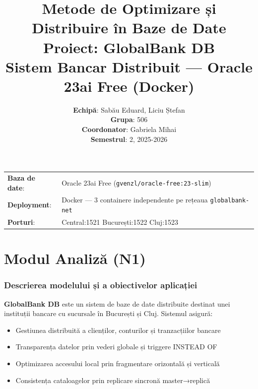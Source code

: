 \documentclass[12pt,a4paper]{article}
\title{
    \textbf{Metode de Optimizare și Distribuire în Baze de Date} \\[0.5em]
    \large Proiect: GlobalBank DB \\
    \normalsize Sistem Bancar Distribuit — Oracle 23ai Free (Docker)
}
\author{
    \textbf{Echipă}: Sabău Eduard, Liciu Ștefan \\
    \textbf{Grupa}: 506 \\
    \textbf{Coordonator}: Gabriela Mihai \\
    \textbf{Semestrul}: 2, 2025-2026
}
\begin{document}

\maketitle\thispagestyle{empty}

\begin{center}
\begin{tabular}{ll}
  \textbf{Baza de date}: & Oracle 23ai Free (\texttt{gvenzl/oracle-free:23-slim}) \\
  \textbf{Deployment}:   & Docker — 3 containere independente pe rețeaua \texttt{globalbank-net} \\
  \textbf{Porturi}:      & Central:1521 \quad București:1522 \quad Cluj:1523 \\
\end{tabular}
\end{center}

\newpage
\tableofcontents
\newpage

\part{Modul Analiză (N1)}

\section{Descrierea modelului și a obiectivelor aplicației}

\textbf{GlobalBank DB} este un sistem de baze de date distribuite destinat unei instituții bancare
cu sucursale în București și Cluj. Sistemul asigură:
\begin{itemize}
  \item Gestiunea distribuită a clienților, conturilor și tranzacțiilor bancare
  \item Transparența datelor prin vederi globale și triggere INSTEAD OF
  \item Optimizarea accesului local prin fragmentare orizontală și verticală
  \item Consistența cataloagelor prin replicare sincronă master→replică
\end{itemize}
\end{document}
